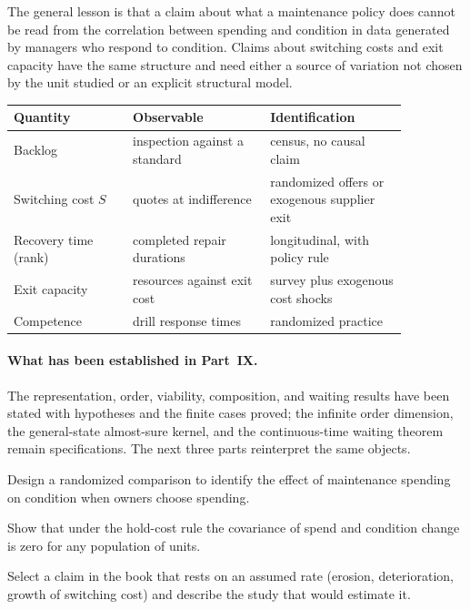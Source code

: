 The general lesson is that a claim about what a maintenance policy does cannot be read from the correlation between spending and condition in data generated by managers who respond to condition. Claims about switching costs and exit capacity have the same structure and need either a source of variation not chosen by the unit studied or an explicit structural model.

\begin{center}
\small
\renewcommand{\arraystretch}{1.2}
\begin{tabular}{@{}p{0.26\linewidth}p{0.3\linewidth}p{0.3\linewidth}@{}}
\toprule
Quantity & Observable & Identification\\
\midrule
Backlog & inspection against a standard & census, no causal claim\\
Switching cost $S$ & quotes at indifference & randomized offers or exogenous supplier exit\\
Recovery time (rank) & completed repair durations & longitudinal, with policy rule\\
Exit capacity & resources against exit cost & survey plus exogenous cost shocks\\
Competence & drill response times & randomized practice\\
\bottomrule
\end{tabular}
\end{center}

\paragraph{What has been established in Part~IX.} The representation, order, viability, composition, and waiting results have been stated with hypotheses and the finite cases proved; the infinite order dimension, the general-state almost-sure kernel, and the continuous-time waiting theorem remain specifications. The next three parts reinterpret the same objects.

\begin{exercise}
Design a randomized comparison to identify the effect of maintenance spending on condition when owners choose spending.
\end{exercise}
\begin{exercise}
Show that under the hold-cost rule the covariance of spend and condition change is zero for any population of units.
\end{exercise}
\begin{exercise}
Select a claim in the book that rests on an assumed rate (erosion, deterioration, growth of switching cost) and describe the study that would estimate it.
\end{exercise}
